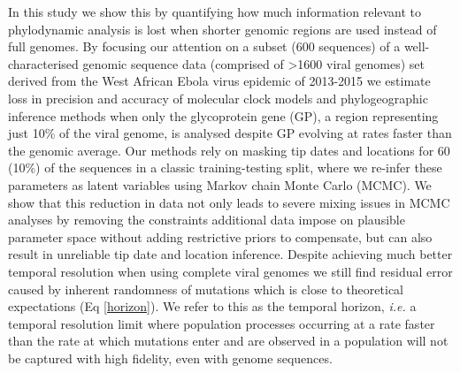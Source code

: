 \documentclass[11pt,oneside,letterpaper]{article}
\begin{document}
In this study we show this by quantifying how much information relevant to phylodynamic analysis is lost when shorter genomic regions are used instead of full genomes.
By focusing our attention on a subset (600 sequences) of a well-characterised genomic sequence data (comprised of >1600 viral genomes) set derived from the West African Ebola virus epidemic of 2013-2015 \citep{dudas_virus_2017} we estimate loss in precision and accuracy of molecular clock models and phylogeographic inference methods when only the glycoprotein gene (GP), a region representing just 10\% of the viral genome, is analysed despite GP evolving at rates faster than the genomic average.
Our methods rely on masking tip dates and locations for 60 (10\%) of the sequences in a classic training-testing split, where we re-infer these parameters as latent variables using Markov chain Monte Carlo (MCMC).
We show that this reduction in data not only leads to severe mixing issues in MCMC analyses by removing the constraints additional data impose on plausible parameter space without adding restrictive priors to compensate, but can also result in unreliable tip date and location inference.
Despite achieving much better temporal resolution when using complete viral genomes we still find residual error caused by inherent randomness of mutations which is close to theoretical expectations (Eq \ref{horizon}).
We refer to this as the temporal horizon, \textit{i.e.} a temporal resolution limit where population processes occurring at a rate faster than the rate at which mutations enter and are observed in a population will not be captured with high fidelity, even with genome sequences.
\end{document}
